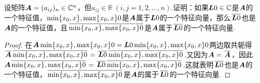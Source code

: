 \begin{example}
设矩阵\(\A = (a_{ij})_n \in \mathbb{C}^n\)，但\(a_{ij} \in \mathbb{R}\ (i,j=1,2,\dotsc,n)\).证明：如果\(\L0\in\mathbb{C}\)是\(\A\)的一个特征值，\(\X0\)是\(\A\)属于\(\L0\)的一个特征向量，那么\(\complexconjugate{\L0}\)也是\(\A\)的一个特征值，且\(\complexconjugate{\X0}\)是\(\A\)属于\(\complexconjugate{\L0}\)的一个特征向量.
\begin{proof}
在\(\A\X0=\L0\X0\)两边取共轭得\(\complexconjugate{\A}\complexconjugate{\X0}=\complexconjugate{\L0}\complexconjugate{\X0}\).又因为\(\A=\complexconjugate{\A}\)，因此\(\A\complexconjugate{\X0}=\complexconjugate{\L0}\complexconjugate{\X0}\).这就表明\(\complexconjugate{\L0}\)也是\(\A\)的一个特征值，\(\complexconjugate{\X0}\)是\(\A\)的属于\(\complexconjugate{\L0}\)的一个特征向量.
\end{proof}
\end{example}

